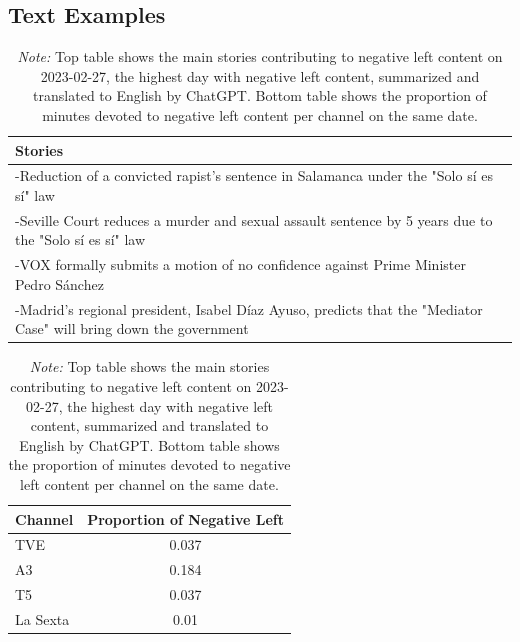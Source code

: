 \documentclass[12pt]{article}
\begin{document}
\clearpage
\subsection{Text Examples}



\begin{table}[!htb]
\caption{Top Stories for Negative Left and Outlet's Production}
\centering
\begin{tabular}{p{}}
	\toprule
	\textbf{Stories}  \\
	\midrule
	-Reduction of a convicted rapist’s sentence in Salamanca under the "Solo sí es sí" law  \\
	-Seville Court reduces a murder and sexual assault sentence by 5 years due to the "Solo sí es sí" law  \\
	-VOX formally submits a motion of no confidence against Prime Minister Pedro Sánchez  \\
	-Madrid’s regional president, Isabel Díaz Ayuso, predicts that the "Mediator Case" will bring down the government  \\
	\bottomrule
\end{tabular}
\begin{tabular}{l c}
	\toprule
	\textbf{Channel} & \textbf{Proportion of Negative Left} \\
	\midrule
	TVE & 0.037 \\
	A3  & 0.184 \\
	T5  & 0.037 \\
	La Sexta  & 0.01 \\
	\bottomrule
\end{tabular}


\caption*{\small  \textit{Note:} Top table shows the main stories contributing to negative left content on 2023-02-27, the highest day with negative left content,  summarized and translated to English by ChatGPT. Bottom table shows the proportion of minutes devoted to negative left content per channel on the same date.}

\label{tab:neg_left_channels}
\end{table}
\end{document}

